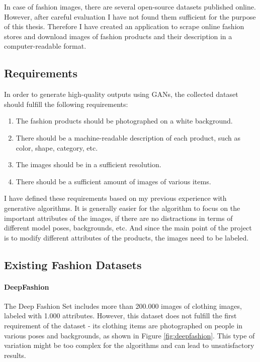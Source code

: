 \documentclass[12pt]{report}
\begin{document}
In case of fashion images, there are several open-source datasets published online. However, after careful evaluation I have not found them sufficient for the purpose of this thesis. Therefore I have created an application to scrape online fashion stores and download images of fashion products and their description in a computer-readable format.

\pagebreak
\subsection{Requirements}

In order to generate high-quality outputs using GANs, the collected dataset should fulfill the following requirements:
\begin{enumerate}
\item The fashion products should be photographed on a white background. 
\item There should be a machine-readable description of each product, such as color, shape, category, etc. 
\item The images should be in a sufficient resolution.
\item There should be a sufficient amount of images of various items.

\end{enumerate}
I have defined these requirements based on my previous experience with generative algorithms. It is generally easier for the algorithm to focus on the important attributes of the images, if there are no distractions in terms of different model poses, backgrounds, etc. And since the main point of the project is to modify different attributes of the products, the images need to be labeled.

\pagebreak
\subsection{Existing Fashion Datasets}
\paragraph{DeepFashion}
The Deep Fashion Set \cite{liu2016deepfashion} includes more than 200.000 images of clothing images, labeled with 1.000 attributes. However, this dataset does not fulfill the first requirement of the dataset - its clothing items are photographed on people in various poses and backgrounds, as shown in Figure \ref{fig:deepfashion}. This type of variation might be too complex for the algorithms and can lead to unsatisfactory results.
\end{document}
